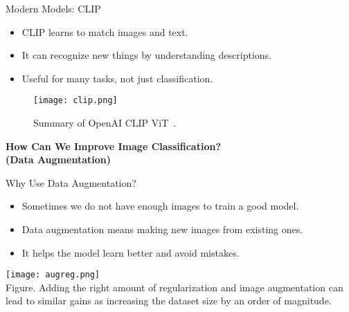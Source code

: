 \begin{refsection}
\begin{frame}{Modern Models: CLIP}
  \begin{itemize}
    \item CLIP learns to match images and text.
    \item It can recognize new things by understanding descriptions.
    \item Useful for many tasks, not just classification.
  \end{itemize}
  \centering
  \begin{figure}
    \centering
    \texttt{[image: clip.png]}
    \caption[]{\scriptsize Summary of OpenAI CLIP ViT~\parencite{radfordLearningTransferableVisual2021}.}
  \end{figure}
  \bottomleftrefs
\end{frame}
\end{refsection}



\begin{refsection}
\begin{frame}
  \centering
  \vspace{2.5cm}
  {\LARGE \textbf{How Can We Improve Image Classification?}\\[0.5em]
  \textbf{(Data Augmentation)}}
\end{frame}
\end{refsection}

\begin{refsection}
\begin{frame}{Why Use Data Augmentation?}
  \begin{minipage}{0.48\linewidth}
    \begin{itemize}
      \item Sometimes we do not have enough images to train a good model.
      \item Data augmentation means making new images from existing ones.
      \item It helps the model learn better and avoid mistakes.
    \end{itemize}
  \end{minipage}%
  \hfill
  \begin{minipage}{0.48\linewidth}
    \centering
    \texttt{[image: augreg.png]}
    \scriptsize \\
    Figure. Adding the right amount of regularization and image augmentation can lead to similar gains as increasing the dataset size by an order of magnitude.~\parencite{steinerHowTrainYour2022}
  \end{minipage}
  \bottomleftrefs
\end{frame}
\end{refsection}

